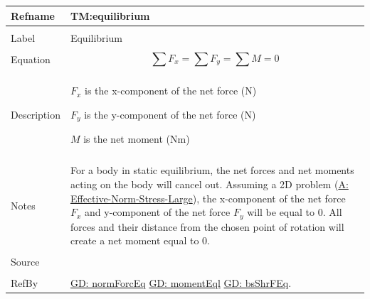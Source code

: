 \documentclass[12pt]{article}
\begin{document}
\noindent \begin{minipage}{\textwidth}
\begin{tabular}{p{} p{}}
\toprule \textbf{Refname} & \textbf{TM:equilibrium}
\label{TM:equilibrium}
\\ \midrule \\
Label & Equilibrium
        \\ \midrule \\
        Equation & \begin{displaymath}
                   \displaystyle\sum{{F_{x}}}=\displaystyle\sum{{F_{y}}}=\displaystyle\sum{M}=0
                   \end{displaymath}
                   \\ \midrule \\
                   Description & \begin{symbDescription}
                                 \item{${F_{x}}$ is the x-component of the net force (N)}
                                 \item{${F_{y}}$ is the y-component of the net force (N)}
                                 \item{$M$ is the net moment (Nm)}
                                 \end{symbDescription}
                                 \\ \midrule \\
                                 Notes & For a body in static equilibrium, the net forces and net moments acting on the body will cancel out. Assuming a 2D problem (\hyperref[assumpENSL]{A: Effective-Norm-Stress-Large}), the x-component of the net force ${F_{x}}$ and y-component of the net force ${F_{y}}$ will be equal to $0$. All forces and their distance from the chosen point of rotation will create a net moment equal to $0$.
                                         \\ \midrule \\
                                         Source & \cite{fredlund1977}
                                                  \\ \midrule \\
                                                  RefBy & \hyperref[GD:normForcEq]{GD: normForcEq} \hyperref[GD:momentEql]{GD: momentEql} \hyperref[GD:bsShrFEq]{GD: bsShrFEq}.
\\ \bottomrule \end{tabular}
\end{minipage}
\par~
\end{document}
